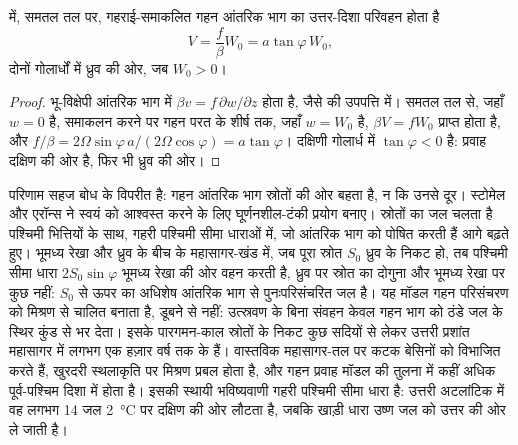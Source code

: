 \begin{proposition}[गहन आंतरिक भाग का ध्रुव-अभिमुख प्रवाह]\label{prop:b3:ocean-dynamics:abyssal}
 में, समतल तल पर, गहराई-समाकलित गहन आंतरिक भाग का
उत्तर-दिशा परिवहन होता है
\[
V = \frac{f}{\beta}W_0 = a\tan\varphi\,W_0 ,
\]
दोनों गोलार्धों में ध्रुव की ओर, जब $W_0 > 0$।
\end{proposition}

\begin{proof}
भू-विक्षेपी आंतरिक भाग में $\beta v = f\,\partial w/\partial z$ होता है, जैसे 
की उपपत्ति में। समतल तल से, जहाँ $w = 0$ है, समाकलन करने पर
गहन परत के शीर्ष तक, जहाँ $w = W_0$ है, $\beta V =
fW_0$ प्राप्त होता है, और $f/\beta = 2\Omega\sin\varphi\,a/(2\Omega\cos\varphi) =
a\tan\varphi$। दक्षिणी गोलार्ध में $\tan\varphi < 0$ है: प्रवाह दक्षिण की ओर है,
फिर भी ध्रुव की ओर।
\end{proof}

परिणाम सहज बोध के विपरीत है: गहन आंतरिक भाग स्रोतों की ओर बहता है,
न कि उनसे दूर। स्टोमेल और एरॉन्स ने स्वयं को आश्वस्त करने के लिए घूर्णनशील-टंकी
प्रयोग बनाए। स्रोतों का जल चलता है
पश्चिमी भित्तियों के साथ, गहरी पश्चिमी सीमा धाराओं में, जो आंतरिक भाग को पोषित करती हैं
आगे बढ़ते हुए। भूमध्य रेखा और ध्रुव के बीच के महासागर-खंड में,
जब पूरा स्रोत $S_0$ ध्रुव के निकट हो, तब पश्चिमी सीमा धारा
$2S_0\sin\varphi$ भूमध्य रेखा की ओर वहन करती है, ध्रुव पर स्रोत का दोगुना और
भूमध्य रेखा पर कुछ नहीं: $S_0$ से ऊपर का अधिशेष
आंतरिक भाग से पुनःपरिसंचरित जल है। यह मॉडल गहन परिसंचरण को मिश्रण से चालित बनाता है,
डूबने से नहीं: उत्स्रवण के बिना संवहन केवल गहन भाग को
ठंडे जल के स्थिर कुंड से भर देता। इसके पारगमन-काल स्रोतों के निकट कुछ सदियों से
लेकर उत्तरी प्रशांत महासागर में लगभग एक हज़ार वर्ष तक के हैं। वास्तविक महासागर-तल पर
कटक बेसिनों को विभाजित करते हैं, खुरदरी स्थलाकृति पर मिश्रण
प्रबल होता है, और गहन प्रवाह मॉडल की तुलना में कहीं अधिक
पूर्व-पश्चिम दिशा में होता है। इसकी स्थायी भविष्यवाणी गहरी पश्चिमी सीमा धारा है: उत्तरी
अटलांटिक में वह लगभग \qty{14}{\sverdrup} जल
\qty{2}{\celsius} पर दक्षिण की ओर लौटता है, जबकि खाड़ी धारा उष्ण जल को
उत्तर की ओर ले जाती है।

